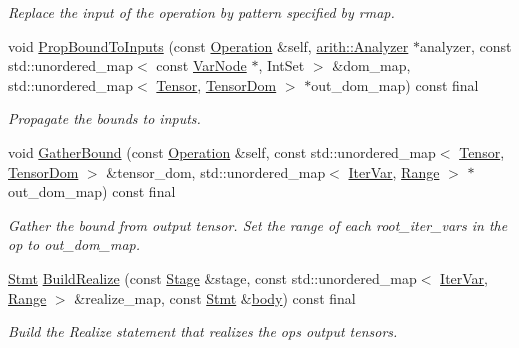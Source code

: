 \begin{DoxyCompactItemize}
\begin{DoxyCompactList}\small\item\em Replace the input of the operation by pattern specified by rmap. \end{DoxyCompactList}\item 
void \hyperlink{classtvm_1_1te_1_1HybridOpNode_aa732ebcde9edbc81fdeb286c72cd84fe}{Prop\+Bound\+To\+Inputs} (const \hyperlink{classtvm_1_1te_1_1Operation}{Operation} \&self, \hyperlink{classtvm_1_1arith_1_1Analyzer}{arith\+::\+Analyzer} $\ast$analyzer, const std\+::unordered\+\_\+map$<$ const \hyperlink{classtvm_1_1tir_1_1VarNode}{Var\+Node} $\ast$, Int\+Set $>$ \&dom\+\_\+map, std\+::unordered\+\_\+map$<$ \hyperlink{classtvm_1_1te_1_1Tensor}{Tensor}, \hyperlink{structtvm_1_1te_1_1TensorDom}{Tensor\+Dom} $>$ $\ast$out\+\_\+dom\+\_\+map) const final
\begin{DoxyCompactList}\small\item\em Propagate the bounds to inputs. \end{DoxyCompactList}\item 
void \hyperlink{classtvm_1_1te_1_1HybridOpNode_a2eba0c1f5eacfed42fdb0d6c18123781}{Gather\+Bound} (const \hyperlink{classtvm_1_1te_1_1Operation}{Operation} \&self, const std\+::unordered\+\_\+map$<$ \hyperlink{classtvm_1_1te_1_1Tensor}{Tensor}, \hyperlink{structtvm_1_1te_1_1TensorDom}{Tensor\+Dom} $>$ \&tensor\+\_\+dom, std\+::unordered\+\_\+map$<$ \hyperlink{classtvm_1_1tir_1_1IterVar}{Iter\+Var}, \hyperlink{classtvm_1_1Range}{Range} $>$ $\ast$out\+\_\+dom\+\_\+map) const final
\begin{DoxyCompactList}\small\item\em Gather the bound from output tensor. Set the range of each root\+\_\+iter\+\_\+vars in the op to out\+\_\+dom\+\_\+map. \end{DoxyCompactList}\item 
\hyperlink{classtvm_1_1tir_1_1Stmt}{Stmt} \hyperlink{classtvm_1_1te_1_1HybridOpNode_ac1c6607a6d13f019792100430a3fa3c7}{Build\+Realize} (const \hyperlink{classtvm_1_1te_1_1Stage}{Stage} \&stage, const std\+::unordered\+\_\+map$<$ \hyperlink{classtvm_1_1tir_1_1IterVar}{Iter\+Var}, \hyperlink{classtvm_1_1Range}{Range} $>$ \&realize\+\_\+map, const \hyperlink{classtvm_1_1tir_1_1Stmt}{Stmt} \&\hyperlink{classtvm_1_1te_1_1HybridOpNode_a77124ad0787c8325f9ba556acdb62feb}{body}) const final
\begin{DoxyCompactList}\small\item\em Build the Realize statement that realizes the op\textquotesingle{}s output tensors. \end{DoxyCompactList}\item 

\end{DoxyCompactItemize}
